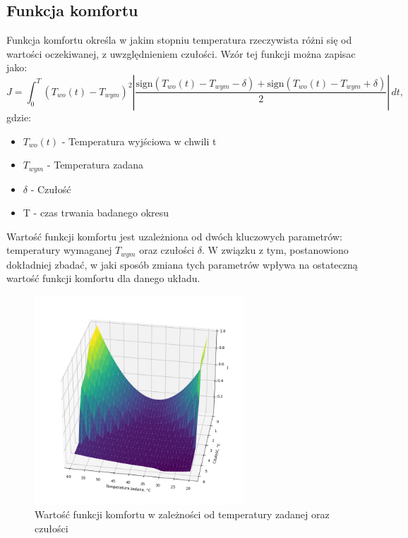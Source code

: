 \documentclass[a4paper,twoside,12pt]{book}
\begin{document}
\newpage
\subsection*{Funkcja komfortu}
Funkcja komfortu określa w jakim stopniu temperatura rzeczywista różni się od wartości oczekiwanej, z uwzględnieniem czułości. Wzór tej funkcji można zapisac jako:
\begin{equation}
  J = \int_{0}^{T} \left( T_{wo}(t) - T_{wym} \right)^2 \left| \frac{\text{sign}(T_{wo}(t) - T_{wym} - \delta) + \text{sign}(T_{wo}(t) - T_{wym} + \delta)}{2} \right| \, dt,
\end{equation}
gdzie:
\begin{itemize}
  \item $T_{wo}(t)$ - Temperatura wyjściowa w chwili t
  \item $T_{wym}$ - Temperatura zadana
  \item $\delta$ - Czułość
  \item T - czas trwania badanego okresu
\end{itemize}

Wartość funkcji komfortu jest uzależniona od dwóch kluczowych parametrów: temperatury wymaganej $T_{wym}$ oraz czułości $\delta$. W związku z tym, postanowiono dokładniej zbadać, w jaki sposób zmiana tych parametrów wpływa na ostateczną wartość funkcji komfortu dla danego układu.

\begin{figure}[!h]
  \centering
  \includegraphics[width=0.7\textwidth]{img/J_3d.png}
  \caption{Wartość funkcji komfortu w zależności od temperatury zadanej oraz czułości}
  \label{fig:J_T_D}
\end{figure}
\end{document}
